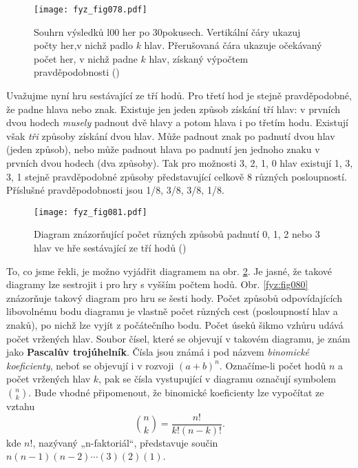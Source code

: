     \begin{figure}[ht!]  %
      \centering
      \texttt{[image: fyz\_fig078.pdf]}
      \caption{Souhrn výsledků l00 her po 30pokusech. Vertikální čáry ukazuj počty her,v nichž 
              padlo \(k\) hlav. Přerušovaná čára ukazuje očekávaný počet her, v nichž padne \(k\) 
              hlav, získaný výpočtem pravděpodobnosti (\cite[s.~80]{Feynman01})}
      \label{fyz:fig078}
    \end{figure}
    
    Uvažujme nyní hru sestávající ze tří hodů. Pro třetí hod je stejně pravděpodobné, že padne 
    hlava nebo znak. Existuje jen jeden způsob získání tří hlav: v prvních dvou hodech 
    \emph{musely} padnout dvě hlavy a potom hlava i po třetím hodu. Existují však \emph{tři} 
    způsoby získání dvou hlav. Může padnout znak po padnutí dvou hlav (jeden způsob), nebo může 
    padnout hlava po padnutí jen jednoho znaku v prvních dvou hodech (dva způsoby). Tak pro možnosti
    \num{3}, \num{2}, \num{1}, \num{0} hlav existují \num{1}, \num{3}, \num{3}, \num{1} stejně 
    pravděpodobné způsoby představující celkově \num{8} různých posloupností. Příslušné 
    pravděpodobnosti jsou \num{1/8}, \num{3/8}, \num{3/8}, \num{1/8}.

    \begin{figure}[ht!]  %
      \centering
      \texttt{[image: fyz\_fig081.pdf]}
      \caption{Diagram znázorňující počet různých způsobů padnutí \num{0}, \num{1}, \num{2} nebo 
              \num{3} hlav ve hře sestávající ze tří hodů (\cite[s.~81]{Feynman01})}
      \label{fyz:fig081}
    \end{figure}
    
    To, co jsme řekli, je možno vyjádřit diagramem na obr. \ref{fyz:fig081}. Je jasné, že takové 
    diagramy lze sestrojit i pro hry s vyšším počtem hodů. Obr. \ref{fyz:fig080} znázorňuje takový 
    diagram pro hru se šesti hody. Počet způsobů odpovídajících libovolnému bodu diagramu je 
    vlastně počet různých cest (posloupností hlav a znaků), po nichž lze vyjít z počátečního bodu. 
    Počet úseků šikmo vzhůru udává počet vržených hlav. Soubor čísel, které se objevují v takovém 
    diagramu, je znám jako \textbf{Pascalův trojúhelník}. Čísla jsou známá i pod názvem 
    \emph{binomické koeficienty}, neboť se objevují i v rozvoji \((a + b)^n\). Označíme-li počet 
    hodů \(n\) a počet vržených hlav \(k\), pak se čísla vystupující v diagramu označují symbolem  
    \(\binom{n}{k}\). Bude vhodné připomenout, že binomické koeficienty 
    lze vypočítat ze vztahu
    \begin{equation}\label{fyz:eq074}
      \binom{n}{k} = \frac{n!}{k!(n-k)!}.
    \end{equation}
    kde \(n!\), nazývaný „n-faktoriál“, představuje součin \(n(n- 1)(n-2)\cdots (3)(2)(1)\).
    

